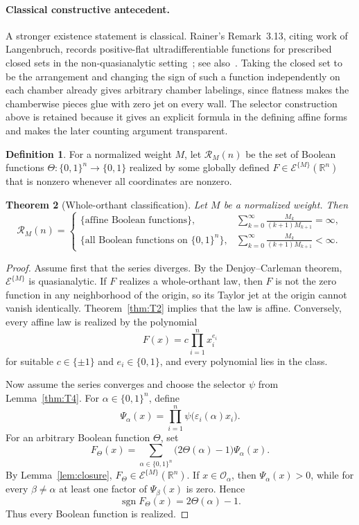 \documentclass[11pt]{article}
\newtheorem{theorem}{Theorem}[section]
\theoremstyle{definition}
\newtheorem{definition}[theorem]{Definition}
\theoremstyle{remark}
\newcommand{\R}{\mathbb{R}}
\newcommand{\bits}{\{0,1\}}
\newcommand{\sign}{\operatorname{sgn}}
\newcommand{\eps}{\varepsilon}
\begin{document}
\paragraph{Classical constructive antecedent.}
A stronger existence statement is classical. Rainer's Remark~3.13, citing work of Langenbruch, records positive-flat ultradifferentiable functions for prescribed closed sets in the non-quasianalytic setting~\cite[Remark~3.13]{Rainer2022}; see also~\cite{Langenbruch2003}. Taking the closed set to be the arrangement and changing the sign of such a function independently on each chamber already gives arbitrary chamber labelings, since flatness makes the chamberwise pieces glue with zero jet on every wall. The selector construction above is retained because it gives an explicit formula in the defining affine forms and makes the later counting argument transparent.

\begin{definition}
For a normalized weight $M$, let $\mathcal{R}_M(n)$ be the set of Boolean functions $\Theta:\bits^n\to\bits$ realized by some globally defined $F\in\mathcal{E}^{\{M\}}(\R^n)$ that is nonzero whenever all coordinates are nonzero.
\end{definition}

\begin{theorem}[Whole-orthant classification]\label{thm:T5}
Let $M$ be a normalized weight. Then
\[
 \mathcal{R}_M(n)=
 \begin{cases}
 \{\text{affine Boolean functions}\},
 &\displaystyle\sum_{k=0}^{\infty}\frac{M_k}{(k+1)M_{k+1}}=\infty,\\[1.1em]
 \{\text{all Boolean functions on }\bits^n\},
 &\displaystyle\sum_{k=0}^{\infty}\frac{M_k}{(k+1)M_{k+1}}<\infty.
 \end{cases}
\]
\end{theorem}

\begin{proof}
Assume first that the series diverges. By the Denjoy--Carleman theorem, $\mathcal{E}^{\{M\}}$ is quasianalytic. If $F$ realizes a whole-orthant law, then $F$ is not the zero function in any neighborhood of the origin, so its Taylor jet at the origin cannot vanish identically. Theorem~\ref{thm:T2} implies that the law is affine. Conversely, every affine law is realized by the polynomial
\[
 F(x)=c\prod_{i=1}^n x_i^{e_i}
\]
for suitable $c\in\{\pm1\}$ and $e_i\in\bits$, and every polynomial lies in the class.

Now assume the series converges and choose the selector $\psi$ from Lemma~\ref{thm:T4}. For $\alpha\in\bits^n$, define
\[
 \Psi_\alpha(x)
 =\prod_{i=1}^n\psi\bigl(\eps_i(\alpha)x_i\bigr).
\]
For an arbitrary Boolean function $\Theta$, set
\begin{equation}\label{eq:booleanselector}
 F_\Theta(x)
 =\sum_{\alpha\in\bits^n}
 \bigl(2\Theta(\alpha)-1\bigr)\Psi_\alpha(x).
\end{equation}
By Lemma~\ref{lem:closure}, $F_\Theta\in\mathcal{E}^{\{M\}}(\R^n)$. If $x\in\mathcal{O}_\alpha$, then $\Psi_\alpha(x)>0$, while for every $\beta\ne\alpha$ at least one factor of $\Psi_\beta(x)$ is zero. Hence
\[
 \sign F_\Theta(x)=2\Theta(\alpha)-1.
\]
Thus every Boolean function is realized.
\end{proof}
\end{document}
